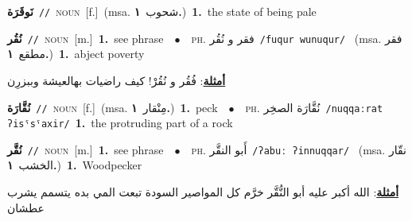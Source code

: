 \documentclass[10pt,a4paper,twoside]{article} %
\begin{document}
\begin{multicols}{2}
{\setlength\topsep{0pt}\textbf{\foreignlanguage{arabic}{نَوقَرَة}}\ {\color{gray}\texttt{//}\color{black}}\ \textsc{noun}\ [f.]\ \color{gray}(msa. \foreignlanguage{arabic}{شحوب}~\foreignlanguage{arabic}{\textbf{١.}})\color{black}\ \textbf{1.}~the state of being pale\ } \vspace{2mm}

{\setlength\topsep{0pt}\textbf{\foreignlanguage{arabic}{نُقُر}}\ {\color{gray}\texttt{//}\color{black}}\ \textsc{noun}\ [m.]\ \textbf{1.}~see phrase\ \ $\bullet$\ \ \textsc{ph.} \color{gray} \foreignlanguage{arabic}{فقر و نُقُر}\color{black}\ {\color{gray}\texttt{/{\sffamily fuqur wunuqur}/}\color{black}}\ \color{gray} (msa. \foreignlanguage{arabic}{فقر مطقع}~\foreignlanguage{arabic}{\textbf{١.}})\color{black}\ \textbf{1.}~abject poverty\  \begin{flushright}\color{gray}\foreignlanguage{arabic}{\textbf{\underline{\foreignlanguage{arabic}{أمثلة}}}: فُقُر و نُقُرْ! كيف راضيات بهالعيشة وببزرِن}\end{flushright}\color{black}} \vspace{2mm}

{\setlength\topsep{0pt}\textbf{\foreignlanguage{arabic}{نُقَّارَة}}\ {\color{gray}\texttt{//}\color{black}}\ \textsc{noun}\ [f.]\ \color{gray}(msa. \foreignlanguage{arabic}{مِنْقار}~\foreignlanguage{arabic}{\textbf{١.}})\color{black}\ \textbf{1.}~peck\ \ $\bullet$\ \ \textsc{ph.} \color{gray} \foreignlanguage{arabic}{نُقَّارَة الصخِر}\color{black}\ {\color{gray}\texttt{/{\sffamily nuqqaːrat ʔisˤsˤaxir}/}\color{black}}\ \textbf{1.}~the protruding part of a rock\ } \vspace{2mm}

{\setlength\topsep{0pt}\textbf{\foreignlanguage{arabic}{نُقَّر}}\ {\color{gray}\texttt{//}\color{black}}\ \textsc{noun}\ [m.]\ \textbf{1.}~see phrase\ \ $\bullet$\ \ \textsc{ph.} \color{gray} \foreignlanguage{arabic}{أَبو النقَّر}\color{black}\ {\color{gray}\texttt{/{\sffamily ʔabuː ʔinnuqqar}/}\color{black}}\ \color{gray} (msa. \foreignlanguage{arabic}{نقّار الخشب}~\foreignlanguage{arabic}{\textbf{١.}})\color{black}\ \textbf{1.}~Woodpecker\  \begin{flushright}\color{gray}\foreignlanguage{arabic}{\textbf{\underline{\foreignlanguage{arabic}{أمثلة}}}: الله أكبر عليه أبو النُّقَّر خرَّم كل المواصير السودة تبعت المي بده يتسمم يشرب عطشان}\end{flushright}\color{black}} \vspace{2mm}


\end{multicols}
\end{document}
